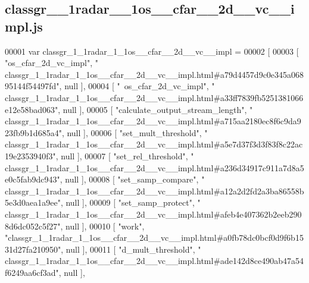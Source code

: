 \subsection{classgr\+\_\+\_\+1radar\+\_\+\_\+1os\+\_\+\+\_\+cfar\+\_\+\+\_\+2d\+\_\+\+\_\+vc\+\_\+\+\_\+impl.\+js}
\label{classgr__1__1radar__1__1os____cfar____2d____vc____impl_8js_source}

\begin{DoxyCode}
00001 var classgr_1_1radar_1_1os__cfar__2d__vc__impl =
00002 [
00003     [ \textcolor{stringliteral}{"os\_cfar\_2d\_vc\_impl"}, \textcolor{stringliteral}{"
      classgr\_1\_1radar\_1\_1os\_\_cfar\_\_2d\_\_vc\_\_impl.html#a79d4457d9c0e345a06895144f54497fd"}, null ],
00004     [ \textcolor{stringliteral}{"~os\_cfar\_2d\_vc\_impl"}, \textcolor{stringliteral}{"
      classgr\_1\_1radar\_1\_1os\_\_cfar\_\_2d\_\_vc\_\_impl.html#a33ff7839fb5251381066e12e58bad063"}, null ],
00005     [ \textcolor{stringliteral}{"calculate\_output\_stream\_length"}, \textcolor{stringliteral}{"
      classgr\_1\_1radar\_1\_1os\_\_cfar\_\_2d\_\_vc\_\_impl.html#a715aa2180ec8f6c9da923fb9b1d685a4"}, null ],
00006     [ \textcolor{stringliteral}{"set\_mult\_threshold"}, \textcolor{stringliteral}{"
      classgr\_1\_1radar\_1\_1os\_\_cfar\_\_2d\_\_vc\_\_impl.html#a5e7d37f3d3f83f8c22ac19e2353940f3"}, null ],
00007     [ \textcolor{stringliteral}{"set\_rel\_threshold"}, \textcolor{stringliteral}{"
      classgr\_1\_1radar\_1\_1os\_\_cfar\_\_2d\_\_vc\_\_impl.html#a236d34917c911a7d8a5e0c5fab9dc943"}, null ],
00008     [ \textcolor{stringliteral}{"set\_samp\_compare"}, \textcolor{stringliteral}{"
      classgr\_1\_1radar\_1\_1os\_\_cfar\_\_2d\_\_vc\_\_impl.html#a12a2d2fd2a3ba86558b5e3d0aea1a9ee"}, null ],
00009     [ \textcolor{stringliteral}{"set\_samp\_protect"}, \textcolor{stringliteral}{"
      classgr\_1\_1radar\_1\_1os\_\_cfar\_\_2d\_\_vc\_\_impl.html#afeb4e407362b2eeb2908d6dc052c5f27"}, null ],
00010     [ \textcolor{stringliteral}{"work"}, \textcolor{stringliteral}{"classgr\_1\_1radar\_1\_1os\_\_cfar\_\_2d\_\_vc\_\_impl.html#a0fb78dc0bcf0d9f6b1531d27fa210950"}, null ],
00011     [ \textcolor{stringliteral}{"d\_mult\_threshold"}, \textcolor{stringliteral}{"
      classgr\_1\_1radar\_1\_1os\_\_cfar\_\_2d\_\_vc\_\_impl.html#ade142d8ce490ab47a54f6249aa6cf3ad"}, null ],

\end{DoxyCode}
